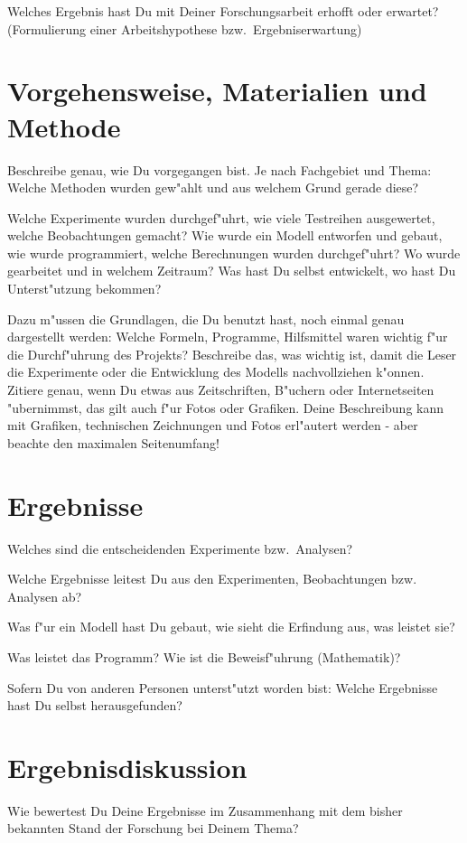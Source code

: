 \documentclass[10pt,twoside]{article}  %
\begin{document}
    Welches Ergebnis hast Du mit Deiner Forschungsarbeit erhofft oder erwartet?
    (Formulierung einer Arbeitshypothese bzw.\ Ergebniserwartung)

  \section{Vorgehensweise, Materialien und Methode} %
    Beschreibe genau, wie Du vorgegangen bist. Je nach Fachgebiet und Thema:
    Welche Methoden wurden gew"ahlt und aus welchem Grund gerade diese?

    Welche Experimente wurden durchgef"uhrt, wie viele Testreihen ausgewertet,
    welche Beobachtungen gemacht? Wie wurde ein Modell entworfen und gebaut,
    wie wurde programmiert, welche Berechnungen wurden durchgef"uhrt? Wo wurde
    gearbeitet und in welchem Zeitraum? Was hast Du selbst entwickelt, wo hast
    Du Unterst"utzung bekommen?

    Dazu m"ussen die Grundlagen, die Du benutzt hast, noch einmal genau
    dargestellt werden: Welche Formeln, Programme, Hilfsmittel waren wichtig
    f"ur die Durchf"uhrung des Projekts? Beschreibe das, was wichtig ist, damit
    die Leser die Experimente oder die Entwicklung des Modells nachvollziehen
    k"onnen. Zitiere genau, wenn Du etwas aus Zeitschriften, B"uchern oder
    Internetseiten "ubernimmst, das gilt auch f"ur Fotos oder Grafiken. Deine
    Beschreibung kann mit Grafiken, technischen Zeichnungen und Fotos
    erl"autert werden - aber beachte den maximalen Seitenumfang!

  \section{Ergebnisse} %
    Welches sind die entscheidenden Experimente bzw.\ Analysen?

    Welche Ergebnisse leitest Du aus den Experimenten, Beobachtungen bzw.\ %
    Analysen ab?

    Was f"ur ein Modell hast Du gebaut, wie sieht die Erfindung aus, was leistet
    sie?

    Was leistet das Programm? Wie ist die Beweisf"uhrung (Mathematik)?

    Sofern Du von anderen Personen unterst"utzt worden bist: Welche Ergebnisse
    hast Du selbst herausgefunden?

  \section{Ergebnisdiskussion} %
    Wie bewertest Du Deine Ergebnisse im Zusammenhang mit dem bisher bekannten
    Stand der Forschung bei Deinem Thema?
\end{document}
